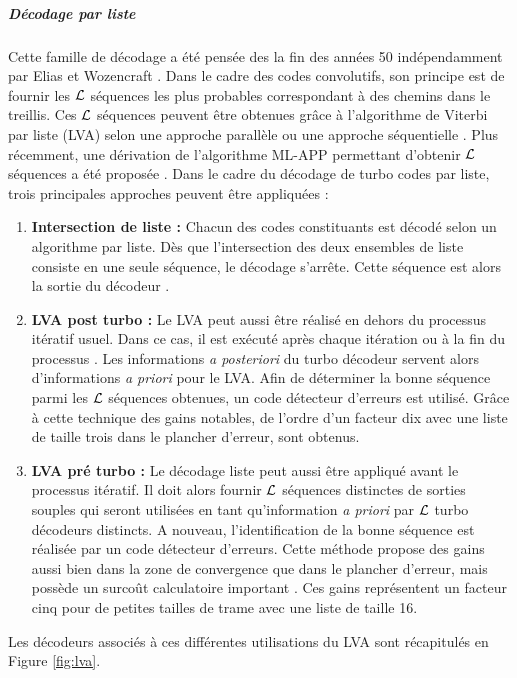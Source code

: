 \subparagraph{Décodage par liste} Cette famille de décodage a été pensée des la fin des années 50 indépendamment par Elias 
et Wozencraft \cite{elias1957list,wozencraft1958list}. Dans le cadre des codes convolutifs, son principe est de fournir 
les $\cal{L}$ séquences les plus probables correspondant à des chemins dans le treillis. Ces $\cal{L}$ séquences peuvent 
être obtenues grâce à l'algorithme de Viterbi par liste (LVA) selon une approche parallèle ou une approche séquentielle 
\cite{lva}. Plus récemment, une dérivation de l'algorithme ML-APP permettant d'obtenir $\cal{L}$ séquences a été proposée 
\cite{mlla}.
Dans le cadre du décodage de turbo codes par liste, trois principales approches peuvent être appliquées :
\begin{enumerate}
	\item \textbf{Intersection de liste : } Chacun des codes constituants est décodé selon un algorithme par liste. Dès 
	que l'intersection des deux ensembles de liste consiste en une seule séquence, le décodage s'arrête. Cette séquence 
	est alors la sortie du décodeur \cite{sadowPair}. 
	\item \textbf{LVA post turbo : }  Le LVA peut aussi être réalisé en dehors du processus itératif usuel. Dans ce cas, 
	il est exécuté après chaque itération ou à la fin du processus \cite{narayaList}. Les informations \textit{a posteriori} 
	du turbo décodeur servent alors d'informations \textit{a priori} pour le LVA. Afin de déterminer la bonne séquence 
	parmi les $\cal{L}$ séquences obtenues, un code détecteur d'erreurs est utilisé. Grâce à cette technique des gains 
	notables, de l'ordre d'un facteur dix avec une liste de taille trois dans le plancher d'erreur, sont obtenus.
	\item \textbf{LVA pré turbo : } Le décodage liste peut aussi être appliqué avant le processus itératif. Il doit alors 
	fournir $\cal{L}$ séquences distinctes de sorties souples qui seront utilisées en tant qu'information \textit{a priori} 
	par $\cal{L}$ turbo décodeurs distincts. A nouveau, l'identification de la bonne séquence est réalisée par un code 
	détecteur d'erreurs. Cette méthode propose des gains aussi bien dans la zone de convergence que dans le plancher 
	d'erreur, mais possède un surcoût calculatoire important \cite{newList}. Ces gains représentent un facteur cinq pour 
	de petites tailles de trame avec une liste de taille 16.
\end{enumerate}

Les décodeurs associés à ces différentes utilisations du LVA sont récapitulés en Figure \ref{fig:lva}. 



